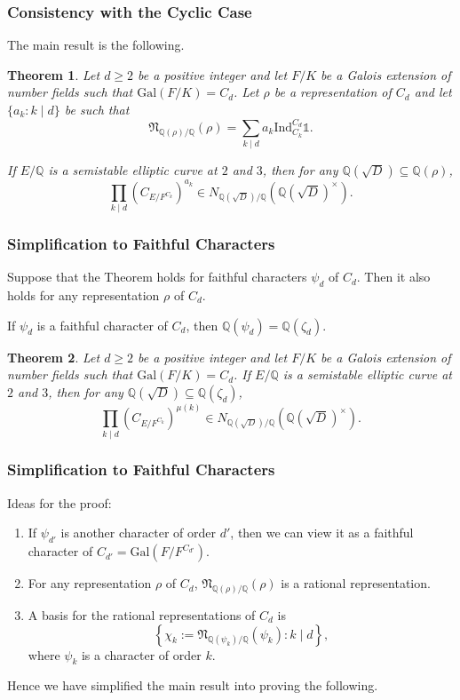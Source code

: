 \documentclass{beamer}
\newcommand{\Gal}{\mathrm{Gal}}
\newcommand{\Ind}{\mathrm{Ind}}
\newcommand{\QQ}{\mathbb{Q}}
\newcommand{\bQ}{\mathbb{Q}}
\newcommand{\fN}{\mathfrak{N}}
\newcommand{\repnorm}[1]{\fN_{\bQ(#1) / \bQ}(#1)}
\theoremstyle{plain}
\newtheorem{thm}{Theorem}[section]
\begin{document}
\begin{frame}
    \frametitle{Consistency with the Cyclic Case}
    The main result is the following.
    \begin{thm}
        Let $d\geq2$ be a positive integer and let $F/K$ be a Galois extension of number fields such that $\Gal(F/K)=C_d$. Let $\rho$ be a representation of $C_d$ and let $\{a_k:k\mid d\}$ be such that $$\repnorm{\rho}=\sum_{k\mid d}a_k\Ind_{C_k}^{C_d}\mathds{1}.$$
    
        \pause If $E/\QQ$ is a semistable elliptic curve at $2$ and $3$, then for any $\QQ(\sqrt{D})\subseteq\QQ(\rho)$,
        $$\prod_{k\mid d}(C_{E/F^{C_k}})^{a_k}\in N_{\QQ(\sqrt{D})/\QQ}(\QQ(\sqrt{D})^{\times}).$$
    \end{thm}

\end{frame}


\begin{frame}
    \frametitle{Simplification to Faithful Characters}

    \begin{lemma}
        Suppose that the Theorem holds for faithful characters $\psi_d$ of $C_d$. Then it also holds for any representation $\rho$ of $C_d$.
    \end{lemma} \pause
    If $\psi_d$ is a faithful character of $C_d$, then $\QQ(\psi_d)=\QQ(\zeta_d)$.
    \begin{thm}
        Let $d\geq2$ be a positive integer and let $F/K$ be a Galois extension of number fields such that $\Gal(F/K)=C_d$. If $E/\QQ$ is a semistable elliptic curve at $2$ and $3$, then for any $\QQ(\sqrt{D})\subseteq\QQ(\zeta_d)$,
        $$\prod_{k\mid d}(C_{E/F^{C_k}})^{\mu(k)}\in N_{\QQ(\sqrt{D})/\QQ}(\QQ(\sqrt{D})^{\times}).$$
    \end{thm}

\end{frame}

\iffalse

\begin{frame}
    \frametitle{Simplification to Faithful Characters}

    Ideas for the proof:
    \begin{enumerate}
        \item If $\psi_{d'}$ is another character of order $d'$, then we can view it as a faithful character of $C_{d'}=\Gal(F/F^{C_{d'}})$. \pause
        \item For any representation $\rho$ of $C_d$, $\repnorm{\rho}$ is a rational representation. \pause
        \item A basis for the rational representations of $C_d$ is 
        $$\left\{\chi_k:=\repnorm{\psi_k}:k\mid d\right\},$$
        where $\psi_k$ is a character of order $k$.
    \end{enumerate}

     Hence we have simplified the main result into proving the following. \pause
    
\end{frame}
\end{document}
